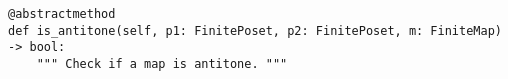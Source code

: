 \par\begin{minipage}{78ex}
\begin{verbatim}
@abstractmethod
def is_antitone(self, p1: FinitePoset, p2: FinitePoset, m: FiniteMap) -> bool:
    """ Check if a map is antitone. """
\end{verbatim}
\end{minipage}\par